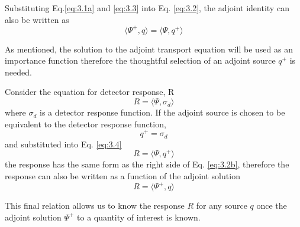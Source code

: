Substituting Eq.\ref{eq:3.1a} and \ref{eq:3.3} into Eq. \ref{eq:3.2}, 
the adjoint identity can also be written as
\begin{equation} \label{eq:3.2b}
		\langle \Psi^{+} , q \rangle =
		\langle \Psi, q^{+} \rangle
\end{equation}

As mentioned, the solution to the adjoint transport
equation will be used as an importance function
therefore the thoughtful selection of an adjoint source $q^{+}$ is needed.

Consider the equation for detector response, R
\begin{equation} \label{eq:3.4}
		R = \langle \Psi, \sigma_{d}\rangle 
\end{equation}
where $\sigma_{d}$ is a detector response function.
If the adjoint source is chosen to be equivalent to the detector response
function,
\begin{equation} \label{eq:3.5}
		q^{+} = \sigma_{d}
\end{equation}
and substituted into Eq. \ref{eq:3.4}  
\begin{equation}\label{eq:resp_adjq}
		R = \langle \Psi, q^{+} \rangle %
\end{equation}
the response has the same form as the right side of Eq. \ref{eq:3.2b}, therefore
the response can also be written as a function of the adjoint solution
\begin{equation}\label{eq:resp_adjf}
		R = \langle \Psi^{+}, q \rangle
\end{equation}

This final relation allows us to know the response $R$ for any source $q$ once the
adjoint solution $\Psi^{+}$ to a quantity of interest is known.

